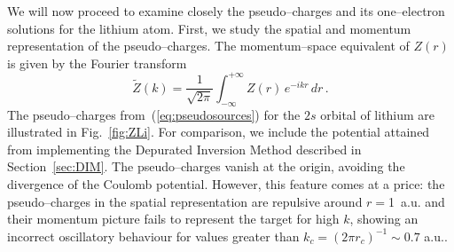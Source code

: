 \documentclass[10pt]{article}
\begin{document}
We will now proceed to examine closely the pseudo--charges and its 
one--electron solutions for the lithium atom. 
First, we study the spatial and momentum representation of the 
pseudo--charges. The momentum--space equivalent of $Z(r)$ is given 
by the Fourier transform
\begin{equation}
 \widetilde{Z}(k) = \frac{1}{\sqrt{2\pi}} \int_{-\infty}^{+\infty} 
 Z(r)\,e^{-ikr}\,dr\,.
\end{equation}
The pseudo--charges from~(\ref{eq:pseudosources}) for the $2s$ 
orbital of lithium are illustrated in Fig.~\ref{fig:ZLi}. 
For comparison, we include the potential attained from implementing 
the Depurated Inversion Method described in Section~\ref{sec:DIM}.
The pseudo--charges vanish at the origin, avoiding the divergence 
of the Coulomb potential. However, this feature comes at a price: 
the pseudo--charges in the spatial representation are repulsive 
around \mbox{$r= $1 a.u.} and their momentum picture fails to represent the 
target for high $k$, showing an incorrect oscillatory behaviour for 
values greater than $k_c=(2\pi r_c)^{-1}\sim0.7$ a.u..
\end{document}
